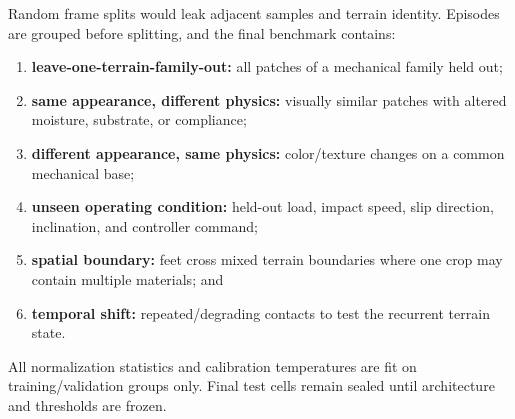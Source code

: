 Random frame splits would leak adjacent samples and terrain identity. Episodes are grouped before splitting, and the final benchmark contains:
\begin{enumerate}
  \item \textbf{leave-one-terrain-family-out:} all patches of a mechanical family held out;
  \item \textbf{same appearance, different physics:} visually similar patches with altered moisture, substrate, or compliance;
  \item \textbf{different appearance, same physics:} color/texture changes on a common mechanical base;
  \item \textbf{unseen operating condition:} held-out load, impact speed, slip direction, inclination, and controller command;
  \item \textbf{spatial boundary:} feet cross mixed terrain boundaries where one crop may contain multiple materials; and
  \item \textbf{temporal shift:} repeated/degrading contacts to test the recurrent terrain state.
\end{enumerate}
All normalization statistics and calibration temperatures are fit on training/validation groups only. Final test cells remain sealed until architecture and thresholds are frozen.
